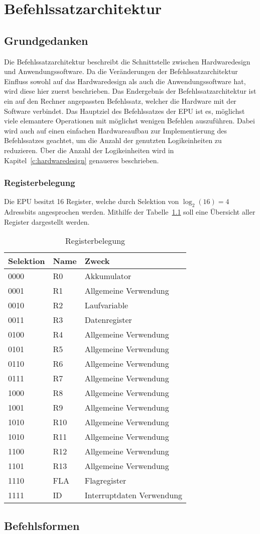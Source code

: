 \chapter{Befehlssatzarchitektur}
\label{c:befehlssatzarchitektur}
\section{Grundgedanken}
Die Befehlssatzarchitektur beschreibt die Schnittstelle zwischen Hardwaredesign und
Anwendungssoftware. Da die Veränderungen der Befehlssatzarchitektur Einfluss sowohl auf das
Hardwaredesign als auch die Anwendungssoftware hat, wird diese hier zuerst beschrieben.
Das Endergebnis der Befehlssatzarchitektur ist ein auf den Rechner angepassten Befehlssatz,
welcher die Hardware mit der Software verbindet. Das Hauptziel des Befehlssatzes der EPU ist es,
möglichst viele elemantere Operationen mit möglichst wenigen Befehlen auszuführen. Dabei wird auch
auf einen einfachen Hardwareaufbau zur Implementierung des Befehlssatzes geachtet, um die Anzahl
der genutzten Logikeinheiten zu reduzieren. Über die Anzahl der Logikeinheiten wird in
Kapitel~\ref{c:hardwaredesign} genaueres beschrieben.
\subsection{Registerbelegung}
Die \ac{EPU} besitzt 16 Register, welche durch Selektion von $\log_2(16) = 4$ Adressbits
angesprochen werden. Mithilfe der Tabelle~\ref{tab:registerbelegung} soll
eine Übersicht aller Register dargestellt werden.

\begin{table}[h]
\centering
\begin{tabular}{lll}
\toprule
Selektion & Name & Zweck\\
\midrule
0000 & R0  & Akkumulator\\
0001 & R1  & Allgemeine Verwendung\\
0010 & R2  & Laufvariable\\
0011 & R3  & Datenregister\\
0100 & R4  & Allgemeine Verwendung\\
0101 & R5  & Allgemeine Verwendung\\
0110 & R6  & Allgemeine Verwendung\\
0111 & R7  & Allgemeine Verwendung\\
1000 & R8  & Allgemeine Verwendung\\
1001 & R9  & Allgemeine Verwendung\\
1010 & R10 & Allgemeine Verwendung\\
1010 & R11 & Allgemeine Verwendung\\
1100 & R12 & Allgemeine Verwendung\\
1101 & R13 & Allgemeine Verwendung\\
1110 & FLA & Flagregister\\
1111 & ID  & Interruptdaten Verwendung\\
\bottomrule
\end{tabular}
\caption{Registerbelegung}
\label{tab:registerbelegung}
\end{table}
\clearpage
\section{Befehlsformen}
